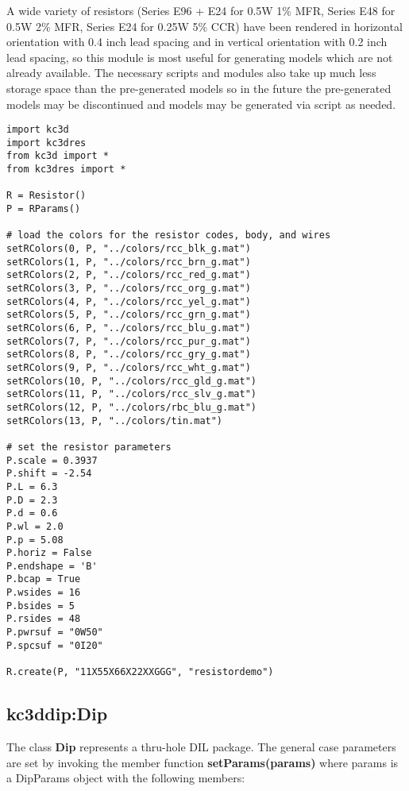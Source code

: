 \documentclass[a4paper, dvipdfm]{article}
\begin{document}
A wide variety of resistors (Series E96 + E24 for 0.5W 1\% MFR, Series E48
for 0.5W 2\% MFR, Series E24 for 0.25W 5\% CCR) have been rendered in
horizontal orientation with 0.4 inch lead spacing and in vertical
orientation with 0.2 inch lead spacing, so this module is most useful
for generating models which are not already available. The necessary
scripts and modules also take up much less storage space than the
pre-generated models so in the future the pre-generated models may
be discontinued and models may be generated via script as needed.

\begin{verbatim}
import kc3d
import kc3dres
from kc3d import *
from kc3dres import *

R = Resistor()
P = RParams()

# load the colors for the resistor codes, body, and wires
setRColors(0, P, "../colors/rcc_blk_g.mat")
setRColors(1, P, "../colors/rcc_brn_g.mat")
setRColors(2, P, "../colors/rcc_red_g.mat")
setRColors(3, P, "../colors/rcc_org_g.mat")
setRColors(4, P, "../colors/rcc_yel_g.mat")
setRColors(5, P, "../colors/rcc_grn_g.mat")
setRColors(6, P, "../colors/rcc_blu_g.mat")
setRColors(7, P, "../colors/rcc_pur_g.mat")
setRColors(8, P, "../colors/rcc_gry_g.mat")
setRColors(9, P, "../colors/rcc_wht_g.mat")
setRColors(10, P, "../colors/rcc_gld_g.mat")
setRColors(11, P, "../colors/rcc_slv_g.mat")
setRColors(12, P, "../colors/rbc_blu_g.mat")
setRColors(13, P, "../colors/tin.mat")

# set the resistor parameters
P.scale = 0.3937
P.shift = -2.54
P.L = 6.3
P.D = 2.3
P.d = 0.6
P.wl = 2.0
P.p = 5.08
P.horiz = False
P.endshape = 'B'
P.bcap = True
P.wsides = 16
P.bsides = 5
P.rsides = 48
P.pwrsuf = "0W50"
P.spcsuf = "0I20"

R.create(P, "11X55X66X22XXGGG", "resistordemo")
\end{verbatim}

\subsection{kc3ddip:Dip}
The class \textbf{Dip} represents a thru-hole DIL package. The general
case parameters are set by invoking the member function \textbf{setParams(params)} where
params is a DipParams object with the following members:
\end{document}
